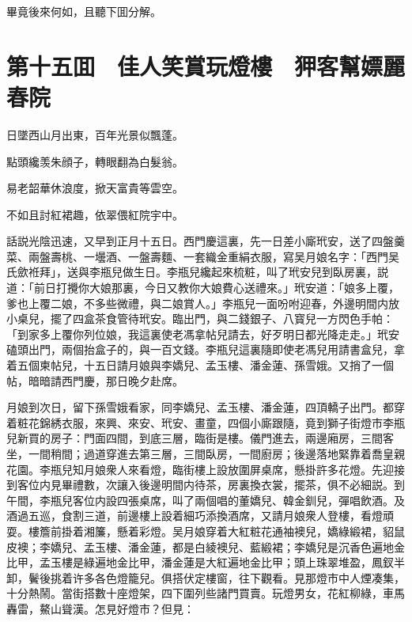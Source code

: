 畢竟後來何如，且聽下囬分解。

\chapter*{第十五囬　佳人笑賞玩燈樓　狎客幫嫖麗春院}

日墜西山月出東，百年光景似飄蓬。

點頭纔羡朱顔子，轉眼翻為白髮翁。

易老韶華休浪度，掀天富貴等雲空。

不如且討紅裙趣，依翠偎紅院宇中。

話説光陰迅速，又早到正月十五日。西門慶這裏，先一日差小廝玳安，送了四盤羹菜、兩盤壽桃、一壜酒、一盤壽麵、一套織金重絹衣服，寫吴月娘名字：「西門吴氏歛袵拜」，送與李瓶兒做生日。李瓶兒纔起來梳粧，叫了玳安兒到臥房裏，説道：「前日打攪你大娘那裏，今日又教你大娘費心送禮來。」玳安道：「娘多上覆，爹也上覆二娘，不多些微禮，與二娘賞人。」李瓶兒一面吩咐迎春，外邊明間内放小桌兒，擺了四盒茶食管待玳安。臨出門，與二錢銀子、八寳兒一方閃色手帕：「到家多上覆你列位娘，我這裏使老馮拿帖兒請去，好歹明日都光降走走。」玳安磕頭出門，兩個抬盒子的，與一百文錢。李瓶兒這裏隨即使老馮兒用請書盒兒，拿着五個柬帖兒，十五日請月娘與李嬌兒、孟玉樓、潘金蓮、孫雪娥。又捎了一個帖，暗暗請西門慶，那日晚夕赴席。

月娘到次日，留下孫雪娥看家，同李嬌兒、孟玉樓、潘金蓮，四頂轎子出門。都穿着粧花錦綉衣服，來興、來安、玳安、畫童，四個小廝跟隨，竟到獅子街燈市李瓶兒新買的房子：門面四間，到底三層，臨街是樓。儀門進去，兩邊廂房，三間客坐，一間稍間；過道穿進去第三層，三間臥房，一間廚房；後邊落地緊靠着喬皇親花園。李瓶兒知月娘衆人來看燈，臨街樓上設放圍屏桌席，懸掛許多花燈。先迎接到客位内見畢禮數，次讓入後邊明間内待茶，房裏換衣裳，擺茶，俱不必細説。到午間，李瓶兒客位内設四張桌席，叫了兩個唱的董嬌兒、韓金釧兒，彈唱飲酒。及酒過五巡，食割三道，前邊樓上設着細巧添換酒席，又請月娘衆人登樓，看燈頑耍。樓簷前掛着湘簾，懸着彩燈。吴月娘穿着大紅粧花通袖襖兒，嬌綠緞裙，貂鼠皮襖；李嬌兒、孟玉樓、潘金蓮，都是白綾襖兒、藍緞裙；李嬌兒是沉香色遍地金比甲，孟玉樓是綠遍地金比甲，潘金蓮是大紅遍地金比甲；頭上珠翠堆盈，鳳釵半卸，鬢後挑着许多各色燈籠兒。俱搭伏定樓窗，往下觀看。見那燈市中人煙凑集，十分熱鬧。當街搭數十座燈架，四下圍列些諸門買賣。玩燈男女，花紅柳綠，車馬轟雷，鰲山聳漢。怎見好燈市？但見：

